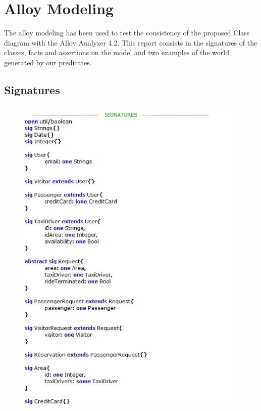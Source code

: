 \documentclass[18pt,oneside,a4paper, titlepage]{article}
\begin{document}
\newpage
\section{Alloy Modeling}
	The alloy modeling has been used to test the consistency of the proposed Class diagram with the Alloy Analyzer 4.2. This report consists in the signatures of the classes, facts and assertions on the model and two examples of the world generated by our predicates.
	\subsection{Signatures}
	\begin{figure}[h]
		\centering
		\includegraphics[scale=0.8]{signatures.jpg}
	\end{figure}
\newpage
\end{document}
